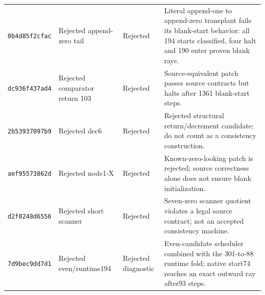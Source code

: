 {\begin{longtable}{@{}>{\raggedright\arraybackslash}p{}>{\raggedright\arraybackslash}p{}>{\raggedright\arraybackslash}p{}>{\raggedright\arraybackslash}p{}@{}}
\texttt{0b4d85f2cfac} & Rejected append-zero tail & Rejected & Literal append-one to append-zero transplant fails its blank-start behavior: all 194 starts classified, four halt and 190 enter proven blank rays.\\[3pt]
\texttt{dc936f437ad4} & Rejected comparator return 103 & Rejected & Source-equivalent patch passes source contracts but halts after 1361 blank-start steps.\\[3pt]
\texttt{2b53937097b9} & Rejected dec6 & Rejected & Rejected structural return/decrement candidate; do not count as a consistency construction.\\[3pt]
\texttt{aef95573862d} & Rejected node1-X & Rejected & Known-zero-looking patch is rejected; source correctness alone does not ensure blank initialization.\\[3pt]
\texttt{d2f0248d6556} & Rejected short scanner & Rejected & Seven-zero scanner quotient violates a legal source contract; not an accepted consistency machine.\\[3pt]
\texttt{7d9bec9dd7d1} & Rejected even/runtime194 & Rejected diagnostic & Even-candidate scheduler combined with the 301-to-88 runtime fold; native start74 reaches an exact outward ray after93 steps.\\[3pt]
\bottomrule\end{longtable}}
